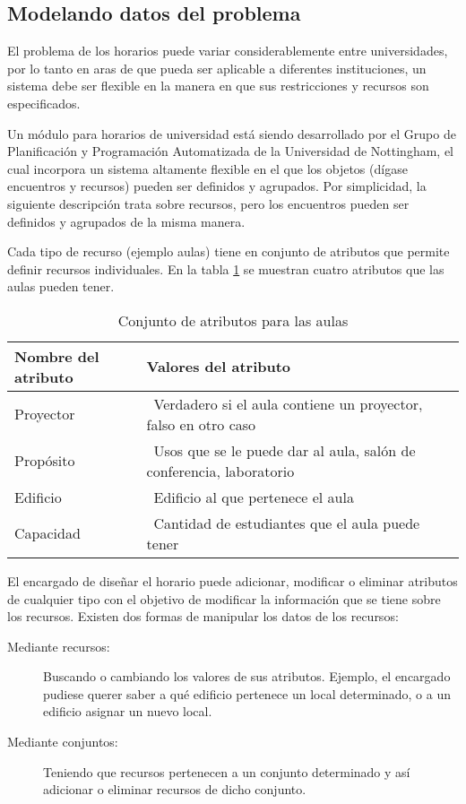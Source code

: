\subsection{Modelando datos del problema}

El problema de los horarios puede variar considerablemente entre universidades, por lo tanto en aras de que pueda ser aplicable a diferentes instituciones, un sistema debe ser flexible en la manera en que sus restricciones y recursos son especificados.

Un módulo para horarios de universidad está siendo desarrollado por el Grupo de Planificación y Programación Automatizada de la Universidad de Nottingham, el cual incorpora un sistema altamente flexible en el que los objetos (dígase encuentros y recursos) pueden ser definidos y agrupados. Por simplicidad, la siguiente descripción trata sobre recursos, pero los encuentros pueden ser definidos y agrupados de la misma manera.

Cada tipo de recurso (ejemplo aulas) tiene en conjunto de atributos que permite definir recursos individuales. En la tabla \ref{table:atributes} se muestran cuatro atributos que las aulas pueden tener.

\begin{table}
	\caption{Conjunto de atributos para las aulas}
	\begin{center}
		\label{table:atributes}
		\begin{tabular}{lp{7.5cm}r}
			Nombre del atributo & Valores del atributo \\ \hline
			Proyector &\ Verdadero si el aula contiene un proyector, falso en otro caso \\
			Propósito &\ Usos que se le puede dar al aula, salón de conferencia, laboratorio \\
			Edificio &\ Edificio al que pertenece el aula \\
			Capacidad &\ Cantidad de estudiantes que el aula puede tener
		\end{tabular}
	\end{center}
\end{table}

El encargado de diseñar el horario puede adicionar, modificar o eliminar atributos de cualquier tipo con el objetivo de modificar la información que se tiene sobre los recursos. Existen dos formas de manipular los datos de los recursos:

\begin{description}
	\item[Mediante recursos:] Buscando o cambiando los valores de sus atributos. Ejemplo, el encargado pudiese querer saber a qu\'e edificio pertenece un local determinado, o a un edificio asignar un nuevo local.
	\item[Mediante conjuntos:] Teniendo que recursos pertenecen a un conjunto determinado y as\'i adicionar o eliminar recursos de dicho conjunto.
\end{description}

